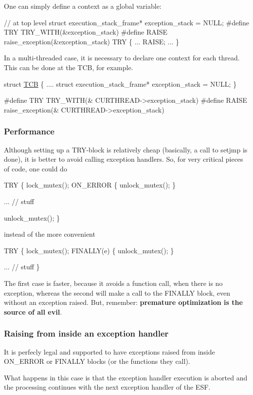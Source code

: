 One can simply define a context as a global variable\-: 
\begin{DoxyCode}
\textcolor{comment}{// at top level}
\textcolor{keyword}{struct }execution\_stack\_frame* exception\_stack = NULL;
\textcolor{preprocessor}{#define TRY  TRY\_WITH(&exception\_stack)}
\textcolor{preprocessor}{}\textcolor{preprocessor}{#define RAISE  raise\_exception(&exception\_stack)}
\textcolor{preprocessor}{}
TRY \{
    ...
    RAISE;
    ...
\}
\end{DoxyCode}


In a multi-\/threaded case, it is necessary to declare one context for each thread. This can be done at the T\-C\-B, for example.


\begin{DoxyCode}
\textcolor{keyword}{struct }\hyperlink{structthread__control__block}{TCB} \{
    ....
    \textcolor{keyword}{struct }execution\_stack\_frame* exception\_stack = NULL;   
\}

\textcolor{preprocessor}{#define TRY  TRY\_WITH(& CURTHREAD->exception\_stack)}
\textcolor{preprocessor}{#define RAISE  raise\_exception(& CURTHREAD->exception\_stack)}
\end{DoxyCode}


\subsubsection*{Performance}

Although setting up a T\-R\-Y-\/block is relatively cheap (basically, a call to {\ttfamily setjmp} is done), it is better to avoid calling exception handlers. So, for very critical pieces of code, one could do 
\begin{DoxyCode}
TRY \{
    lock\_mutex();
    ON\_ERROR \{
        unlock\_mutex();
    \}

    ... \textcolor{comment}{// stuff}

    unlock\_mutex();
\}
\end{DoxyCode}
 instead of the more convenient 
\begin{DoxyCode}
TRY \{
    lock\_mutex();
    FINALLY(e) \{
        unlock\_mutex();
    \}

    ... \textcolor{comment}{// stuff    }
\}
\end{DoxyCode}


The first case is faster, because it avoids a function call, when there is no exception, whereas the second will make a call to the {\ttfamily F\-I\-N\-A\-L\-L\-Y} block, even without an exception raised. But, remember\-: {\bfseries premature optimization is the source of all evil}.

\subsubsection*{Raising from inside an exception handler}

It is perfecly legal and supported to have exceptions raised from inside {\ttfamily O\-N\-\_\-\-E\-R\-R\-O\-R} or {\ttfamily F\-I\-N\-A\-L\-L\-Y} blocks (or the functions they call).

What happens in this case is that the exception handler execution is aborted and the processing continues with the next exception handler of the E\-S\-F. 